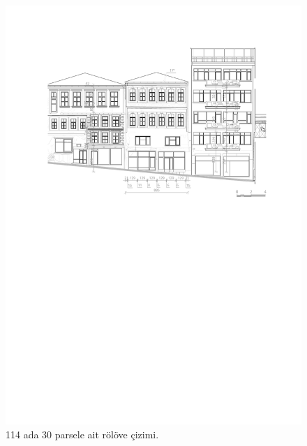 \begin{figure}
\centering
\includegraphics[width=1\textwidth,height=\textheight]{source/figures/Roloveler/R114-30.pdf}
\caption{114 ada 30 parsele ait rölöve çizimi.}
\end{figure}

